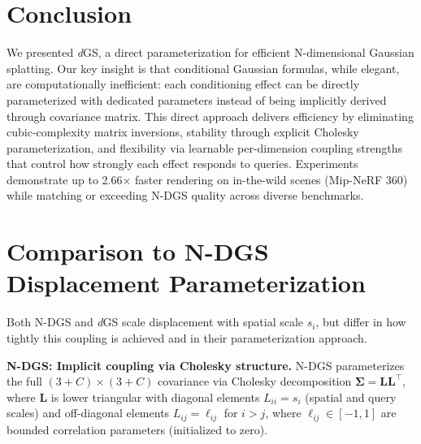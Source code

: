 \documentclass{article}
\newcommand{\modelname}{\textit{d}GS}
\theoremstyle{plain}
\theoremstyle{definition}
\theoremstyle{remark}
\begin{document}
\section{Conclusion}

We presented \modelname{}, a direct parameterization for efficient N-dimensional Gaussian splatting. Our key insight is that conditional Gaussian formulas, while elegant, are computationally inefficient: each conditioning effect can be directly parameterized with dedicated parameters instead of being implicitly derived through covariance matrix. This direct approach delivers efficiency by eliminating cubic-complexity matrix inversions, stability through explicit Cholesky parameterization, and flexibility via learnable per-dimension coupling strengths that control how strongly each effect responds to queries. Experiments demonstrate up to 2.66$\times$ faster rendering on in-the-wild scenes (Mip-NeRF 360) while matching or exceeding N-DGS quality across diverse benchmarks.




\newpage
\appendix
\onecolumn
\section{Comparison to N-DGS Displacement Parameterization}
\label{sec:spatial_scaling_proof}

Both N-DGS \cite{gao20246dgs, gao20257dgs} and \modelname{} scale displacement with spatial scale $s_i$, but differ in how tightly this coupling is achieved and in their parameterization approach.

\textbf{N-DGS: Implicit coupling via Cholesky structure.} N-DGS parameterizes the full $(3+C) \times (3+C)$ covariance via Cholesky decomposition $\boldsymbol{\Sigma} = \mathbf{L}\mathbf{L}^\top$, where $\mathbf{L}$ is lower triangular with diagonal elements $L_{ii} = s_i$ (spatial and query scales) and off-diagonal elements $L_{ij} = \ell_{ij}$ for $i > j$, where $\ell_{ij} \in [-1,1]$ are bounded correlation parameters (initialized to zero).
\end{document}
